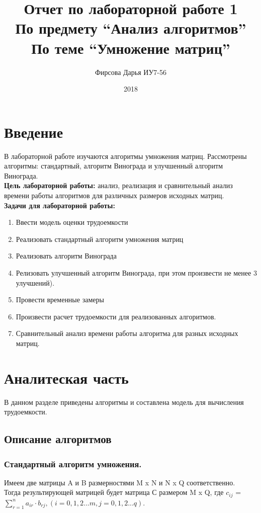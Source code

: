 \documentclass[12pt]{article}
\title{Отчет по лабораторной работе 1 \\ 
	По предмету “Анализ алгоритмов” \\
	По теме “Умножение матриц”
}
\date{2018}
\author{Фирсова Дарья ИУ7-56}
\begin{document}
  
	\maketitle  
	\newpage
	\section*{Введение}
	В лабораторной работе изучаются алгоритмы умножения матриц. Рассмотрены алгоритмы: стандартный, алгоритм Винограда и улучшенный алгоритм Винограда. \\
	\textbf{Цель лабораторной работы:} анализ, реализация и сравнительный анализ времени работы алгоритмов для различных размеров исходных матриц. \\
	 \textbf{Задачи для лабораторной работы:}
\begin{enumerate}
	\item Ввести модель оценки трудоемкости
	\item Реализовать стандартный алгоритм умножения матриц
	\item Реализовать алгоритм Винограда
	\item Релизовать улучшенный алгоритм Винограда, при этом произвести не менее 3 улучшений).
	\item Провести временные замеры
	\item Произвести расчет трудоемкости для реализованных алгоритмов.
	\item Сравнительный анализ времени работы алгоритма для разных исходных матриц.
\end{enumerate}
\newpage

\section{Аналитеская часть}
В данном разделе приведены алгоритмы и составлена модель для вычисления трудоемкости.
\subsection{Описание алгоритмов}

\subsubsection{Стандартный алгоритм умножения. }

Имеем две матрицы A и B размерностями M x N и N x Q соответственно. \\Тогда результирующей матрицей будет матрица С размером M x Q, где $c_{ij}$ = $\sum_{r=1}^n a_{ir}\cdot b_{rj} ,   (i = 0,1,2...m, j = 0,1,2...q)$.
\\
\\
\end{document}
